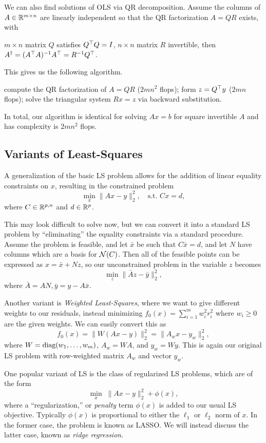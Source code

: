 \documentclass[11 pt]{scrartcl}
\begin{document}
We can also find solutions of OLS via QR decomposition. 
Assume the columns of $A\in \mathbb R^{m\times n}$ are linearly independent so that the QR factorization $A = QR$ exists, with 
\begin{itemize}
    \ii $m\times n$ matrix $Q$ satisfies $Q^\top Q = I$, 
    \ii $n\times n$ matrix $R$ invertible,
    \ii then $A^\dagger = (A^\top A)^{-1} A^\top = R^{-1} Q^\top$.
\end{itemize}
This gives us the following algorithm.
\begin{itemize}
    \ii compute the QR factorization of $A = QR$ ($2mn^2$ flops);
    \ii form $z = Q^\top y$ ($2mn$ flops); 
    \ii solve the triangular system $Rx = z$ via backward substitution. 
\end{itemize}

In total, our algorithm is identical for solving $Ax = b$ for square invertible $A$ and has complexity is $2mn^2$ flops.

\subsection{Variants of Least-Squares}
A generalization of the basic LS problem allows for the addition of linear equality constraints on $x$, resulting in the constrained problem 
\[ \min_x \|Ax - y\|_2^2,\quad \text{s.t. } Cx = d,\] 
where $C\in \mathbb R^{p,n}$ and $d \in \mathbb R^p$. 

This may look difficult to solve now, but we can convert it into a standard LS problem by ``eliminating'' the equality constraints via a standard procedure. 
Assume the problem is feasible, and let $\bar{x}$ be such that $C\bar{x} = d$, and let $N$ have columns which are a basis for $\mathcal N(C)$. 
Then all of the feasible points can be expressed as $x = \bar{x} + Nz$, so our unconstrained problem in the variable $z$ becomes 
\[ \min_z \|\bar{A} z - \bar{y} \|_2^2,\] 
where $\bar{A} = AN, \bar{y} = y - A\bar{x}$. 

Another variant is \emph{Weighted Least-Squares}, where we want to give different weights to our residuals, instead minimizing $f_0(x) = \sum_{i=1}^m w_i^2 r_i^2$ where $w_i\geq 0$ are the given weights. 
We can easily convert this as 
\[ f_0(x) = \|W(Ax - y)\|^2_2 = \|A_w x - y_w \|_2^2,\] 
where $W = \text{diag} (w_1, \dots, w_m)$, $A_w = WA$, and $y_w = Wy$. 
This is again our original LS problem with row-weighted matrix $A_w$ and vector $y_w$. 

One popular variant of LS is the class of regularized LS problems, which are of the form 
\[ \min_x\; \|Ax - y\|_2^2 + \phi(x),\] 
where a ``regularization,'' or \emph{penalty} term $\phi(x)$ is added to our usual LS objective. 
Typically $\phi(x)$ is proportional to either the $\ell_1$ or $\ell_2$ norm of $x$. 
In the former case, the problem is known as LASSO. 
We will instead discuss the latter case, known as \emph{ridge regression}. 
\end{document}
